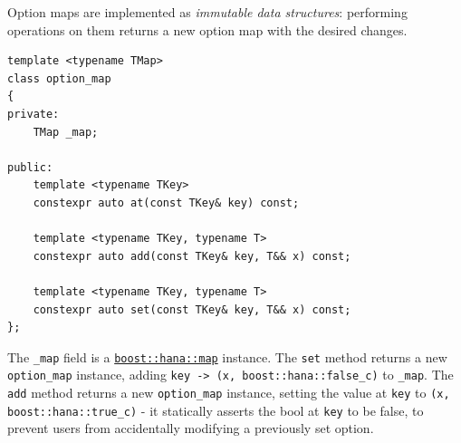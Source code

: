\documentclass[oneside, 12pt, a4paper, openany]{book}
\begin{document}
Option maps are implemented as \emph{immutable data structures}:
performing operations on them returns a new option map with the desired
changes.

\begin{verbatim}
template <typename TMap>
class option_map
{
private:
    TMap _map;

public:
    template <typename TKey>
    constexpr auto at(const TKey& key) const;

    template <typename TKey, typename T>
    constexpr auto add(const TKey& key, T&& x) const;

    template <typename TKey, typename T>
    constexpr auto set(const TKey& key, T&& x) const;
};
\end{verbatim}

The
\texttt{_map}
field is a
\href{http://www.boost.org/doc/libs/1_61_0/libs/hana/doc/html/structboost_1_1hana_1_1map.html}{\texttt{boost::hana::map}}
instance. The
\texttt{set}
method returns a new
\texttt{option_map}
instance, adding
\texttt{key -> (x, boost::hana::false_c)}
to
\texttt{_map}.
The
\texttt{add}
method returns a new
\texttt{option_map}
instance, setting the value at
\texttt{key}
to
\texttt{(x, boost::hana::true_c)}
- it statically asserts the bool at
\texttt{key}
to be false, to prevent users from accidentally modifying a previously
set option.
\end{document}
